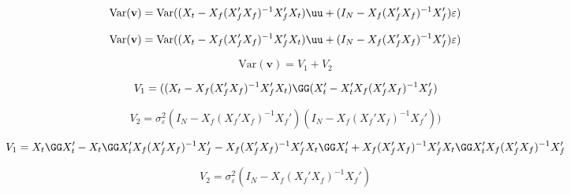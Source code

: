 $$ \text{Var}(\mathbf{v}) = \text{Var}((X_t - X_f(X_f'X_f)^{-1}X_f'X_t)\uu + (I_N - X_f(X_f'X_f)^{-1}X_f')\varepsilon) $$

$$ \text{Var}(\mathbf{v}) = \text{Var}((X_t - X_f(X_f'X_f)^{-1}X_f'X_t)\uu + (I_N - X_f(X_f'X_f)^{-1}X_f')\varepsilon) $$

$$ \text{Var}(\mathbf{v}) = V_1 + V_2 $$

$$V_1 = ((X_t - X_f(X_f'X_f)^{-1}X_f'X_t)\GG (X_t' - X_t'X_f(X_f'X_f)^{-1}X_f') $$

$$V_2 = \sigma_\varepsilon^2(I_N - X_f(X_f'X_f)^{-1}X_f')(I_N - X_f(X_f'X_f)^{-1}X_f')) $$

$$ V_1 = X_t \GG  X_t' - X_t \GG X_t'X_f(X_f'X_f)^{-1}X_f' - X_f(X_f'X_f)^{-1}X_f'X_t \GG X_t' + X_f(X_f'X_f)^{-1}X_f'X_t \GG X_t'X_f(X_f'X_f)^{-1}X_f' $$

$$ V_2 = \sigma_\varepsilon^2 (I_N - X_f(X_f'X_f)^{-1}X_f') $$



